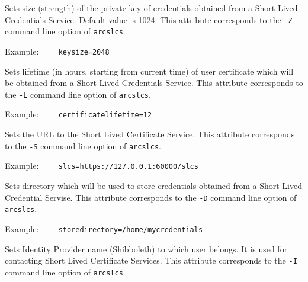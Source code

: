 Sets size (strength) of the private key of credentials obtained from a Short
Lived Credentials Service. Default value is 1024. This attribute
corresponds to the \verb#-Z# command line option of \texttt{arcslcs}.

Example:
\verb#    keysize=2048#

{}
\hspace*{0.5cm}
\begin{shaded}
\end{shaded}

Sets lifetime (in hours, starting from current time) of user certificate which
will be obtained from a Short Lived Credentials Service. This attribute
corresponds to the \verb#-L# command line option of \texttt{arcslcs}.

Example:
\verb#    certificatelifetime=12#

{}
\hspace*{0.5cm}
\begin{shaded}
\end{shaded}

Sets the URL to the Short Lived Certificate Service. This attribute
corresponds to the \verb#-S# command line option of \texttt{arcslcs}.

Example:
\verb#    slcs=https://127.0.0.1:60000/slcs#

{}
\hspace*{0.5cm}
\begin{shaded}
\end{shaded}

Sets directory which will be used to store credentials obtained from a Short
Lived Credential Servise. This attribute
corresponds to the \verb#-D# command line option of \texttt{arcslcs}.

Example:
\verb#    storedirectory=/home/mycredentials#

{}
\hspace*{0.5cm}
\begin{shaded}
\end{shaded}

Sets Identity Provider name (Shibboleth) to which user belongs. It is used for
contacting Short Lived Certificate Services. This attribute
corresponds to the \verb#-I# command line option of \texttt{arcslcs}.

